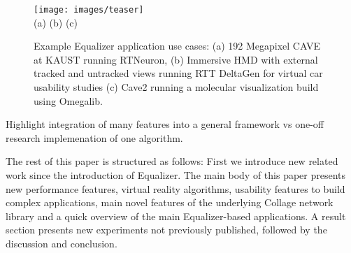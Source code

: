 \documentclass[10pt,journal,compsoc]{IEEEtran}
\begin{document}
%
\IEEEpeerreviewmaketitle

\begin{figure}[ht]\center
  \texttt{[image: images/teaser]} \\
  (a) \hfil \hfil (b) \hfil \hfil (c)
  \vspace{-2mm}
  \caption{Example Equalizer application use cases: (a) 192 Megapixel CAVE at
    KAUST running RTNeuron, (b) Immersive HMD with external tracked and
    untracked views running RTT DeltaGen for virtual car usability studies (c)
    Cave2 running a molecular visualization build using Omegalib.}
  \label{FIG_teaser}
\end{figure}



Highlight integration of many features into a general framework vs one-off
research implemenation of one algorithm.

The rest of this paper is structured as follows: First we introduce new related
work since the introduction of Equalizer. The main body of this paper presents
new performance features, virtual reality algorithms, usability features to
build complex applications, main novel features of the underlying Collage
network library and a quick overview of the main Equalizer-based applications. A
result section presents new experiments not previously published, followed by
the discussion and conclusion.
\end{document}
